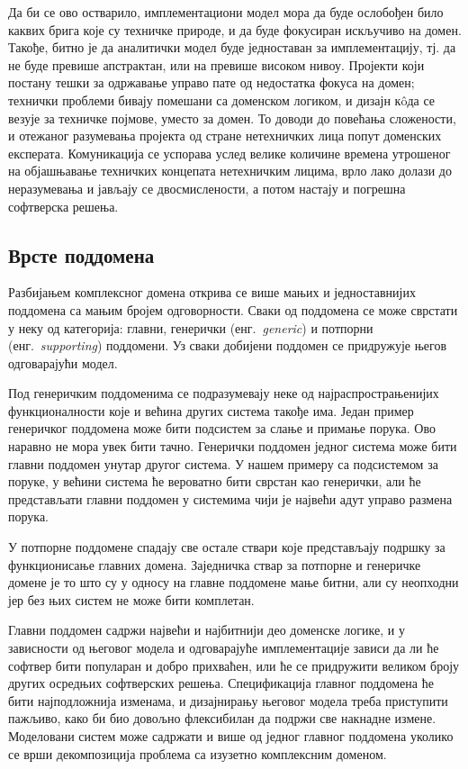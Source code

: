 \documentclass[12pt,oneside]{memoir}
\begin{document}
Да би се ово остварило, имплементациони модел мора да буде ослобођен било каквих брига које су техничке природе, и да буде фокусиран искључиво на домен. Такође, битно је да аналитички модел буде једноставан за имплементацију, тј. да не буде превише апстрактан, или на превише високом нивоу. Пројекти који постану тешки за одржавање управо пате од недостатка фокуса на домен; технички проблеми бивају помешани са доменском логиком, и дизајн кôда се везује за техничке појмове, уместо за домен. То доводи до повећања сложености, и отежаног разумевања пројекта од стране нетехничких лица попут доменских експерата. Комуникација се успорава услед велике количине времена утрошеног на објашњавање техничких концепата нетехничким лицима, врло лако долази до неразумевања и јављају се двосмислености, а потом настају и погрешна софтверска решења.

\subsection{Врсте поддомена}
Разбијањем комплексног домена открива се више мањих и једноставнијих поддомена са мањим бројем одговорности. Сваки од поддомена се може сврстати у неку од категорија: главни, генерички (енг.~\textit{generic}) и потпорни (енг.~\textit{supporting}) поддомени. Уз сваки добијени поддомен се придружује његов одговарајући модел.

Под генеричким поддоменима се подразумевају неке од најраспрострањенијих функционалности које и већина других система такође има. Један пример генеричког поддомена може бити подсистем за слање и примање порука. Ово наравно не мора увек бити тачно. Генерички поддомен једног система може бити главни поддомен унутар другог система. У нашем примеру са подсистемом за поруке, у већини система ће вероватно бити сврстан као генерички, али ће представљати главни поддомен у системима чији је највећи адут управо размена порука.

У потпорне поддомене спадају све остале ствари које представљају подршку за функционисање главних домена. Заједничка ствар за потпорне и генеричке домене је то што су у односу на главне поддомене мање битни, али су неопходни јер без њих систем не може бити комплетан.

Главни поддомен садржи највећи и најбитнији део доменске логике, и у зависности од његовог модела и одговарајуће имплементације зависи да ли ће софтвер бити популаран и добро прихваћен, или ће се придружити великом броју других осредњих софтверских решења. Спецификација главног поддомена ће бити најподложнија изменама, и дизајнирању његовог модела треба приступити пажљиво, како би био довољно флексибилан да подржи све накнадне измене. Моделовани систем може садржати и више од једног главног поддомена уколико се врши декомпозиција проблема са изузетно комплексним доменом.
\end{document}
